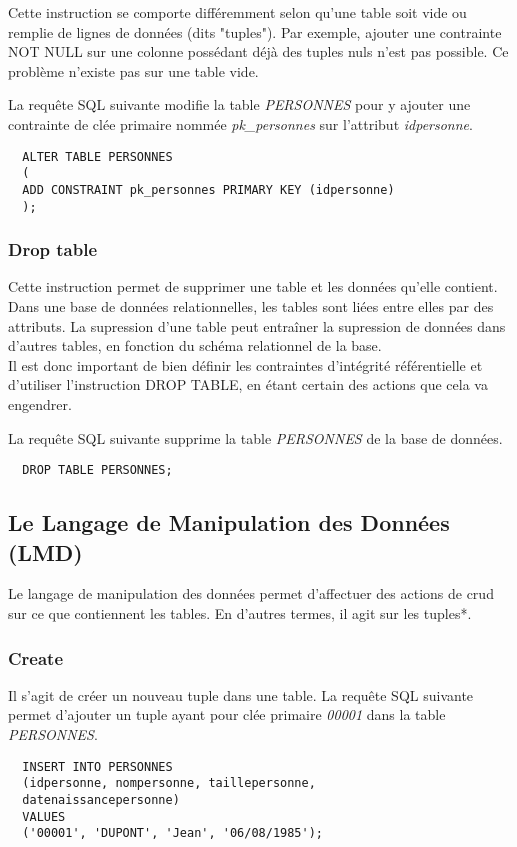 Cette instruction se comporte différemment selon qu'une table soit vide ou remplie de lignes de données (dits "\glspl{tuple}").
Par exemple, ajouter une contrainte NOT NULL sur une colonne possédant déjà des tuples nuls n'est pas possible. Ce problème n'existe pas sur une table vide.

La requête SQL suivante modifie la table \textit{PERSONNES} pour y ajouter une contrainte de clée primaire nommée \textit{pk\_personnes} sur l'attribut \textit{idpersonne}.

\begin{lstlisting}
  ALTER TABLE PERSONNES
  (
  ADD CONSTRAINT pk_personnes PRIMARY KEY (idpersonne)
  );
\end{lstlisting}

\subsubsection{Drop table}
Cette instruction permet de supprimer une table et les données qu'elle contient.
Dans une base de données relationnelles, les tables sont liées entre elles par des attributs.
La supression d'une table peut entraîner la supression de données dans d'autres tables, en fonction du schéma relationnel de la base.\\
Il est donc important de bien définir les contraintes d'intégrité référentielle et d'utiliser l'instruction DROP TABLE, en étant certain des actions que cela va engendrer.

La requête SQL suivante supprime la table \textit{PERSONNES} de la base de données.
\begin{lstlisting}
  DROP TABLE PERSONNES;
\end{lstlisting}

\subsection{Le Langage de Manipulation des Données (LMD)}
Le langage de manipulation des données permet d'affectuer des actions de \gls{crud} sur ce que contiennent les tables.
En d'autres termes, il agit sur les tuples*.

\subsubsection{Create}
Il s'agit de créer un nouveau tuple dans une table.
La requête SQL suivante permet d'ajouter un tuple ayant pour clée primaire \textit{00001} dans la table \textit{PERSONNES}.
\begin{lstlisting}
  INSERT INTO PERSONNES
  (idpersonne, nompersonne, taillepersonne,
  datenaissancepersonne)
  VALUES
  ('00001', 'DUPONT', 'Jean', '06/08/1985');
\end{lstlisting}

